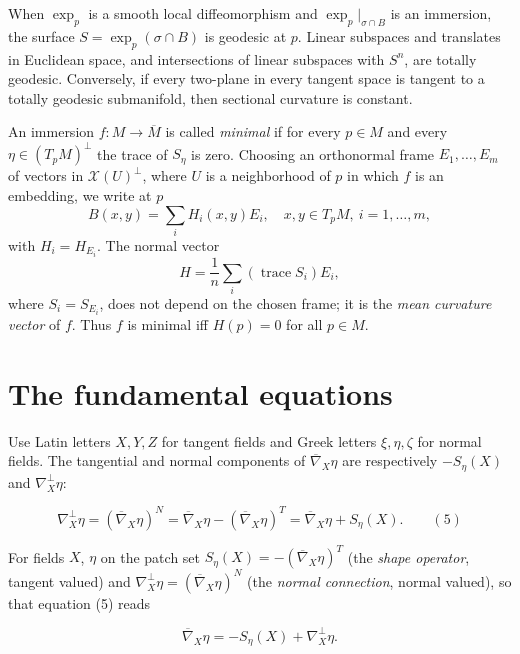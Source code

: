 \begin{remark}
  \label{rem:dc-ch6-2-9-exp-surface}


  When $\exp_p$ is a smooth local diffeomorphism and
  $\exp_p|_{\sigma\cap B}$ is an immersion, the surface
  $S=\exp_p(\sigma\cap B)$ is geodesic at $p$. Linear subspaces and translates
  in Euclidean space, and intersections of linear subspaces with $S^n$, are
  totally geodesic. Conversely, if every two-plane in every tangent space is
  tangent to a totally geodesic submanifold, then sectional curvature is
  constant.
\end{remark}

\begin{definition}
  \label{def:dc-ch6-2-10}


  An immersion $f:M\to\overline{M}$ is called \emph{minimal} if for every $p\in M$ and
  every $\eta\in(T_pM)^\perp$ the trace of $S_\eta$ is zero. Choosing an orthonormal frame
  $E_1,\dots,E_m$ of vectors in $\mathcal{X}(U)^\perp$, where $U$ is a neighborhood
  of $p$ in which $f$ is an embedding, we write at $p$
  $$
  B(x,y)=\sum_i H_i(x,y)E_i,\quad x,y\in T_pM,\ i=1,\dots,m,
  $$
  with $H_i=H_{E_i}$. The normal vector
  $$
  H=\frac{1}{n}\sum_i(\operatorname{trace}S_i)E_i,
  $$
  where $S_i=S_{E_i}$, does not depend on the chosen frame; it is the \emph{mean
  curvature vector} of $f$. Thus $f$ is minimal iff $H(p)=0$ for all $p\in M$.
\end{definition}

\section{The fundamental equations}

Use Latin letters $X,Y,Z$ for tangent fields and Greek letters $\xi,\eta,\zeta$
for normal fields. The tangential and normal components of
$\overline{\nabla}_X\eta$ are respectively $-S_\eta(X)$ and $\nabla_X^\perp\eta$:

$$
\nabla_X^\perp\eta=(\overline{\nabla}_X\eta)^N=\overline{\nabla}_X\eta-(\overline{\nabla}_X\eta)^T=\overline{\nabla}_X\eta+S_\eta(X).\qquad(5)
$$

\begin{definition}
  \label{def:dc-ch6-3-normal-connection}


  For fields $X$, $\eta$ on the patch set
  $S_\eta(X)=-(\overline{\nabla}_X\eta)^T$ (the \emph{shape operator}, tangent
  valued) and $\nabla^\perp_X\eta=(\overline{\nabla}_X\eta)^N$ (the \emph{normal
  connection}, normal valued), so that equation (5) reads

  $$
  \overline{\nabla}_X\eta=-S_\eta(X)+\nabla^\perp_X\eta.
  $$
\end{definition}

